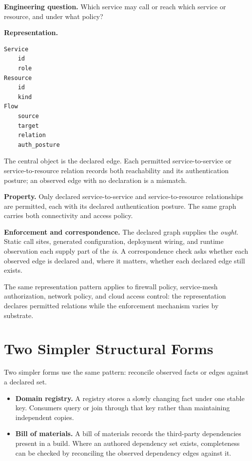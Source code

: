 \textbf{Engineering question.} Which service may call or reach which service or resource, and under what policy?

\textbf{Representation.}

\begin{verbatim}
Service
    id
    role
Resource
    id
    kind
Flow
    source
    target
    relation
    auth_posture
\end{verbatim}

The central object is the declared edge. Each permitted service-to-service or service-to-resource relation records both reachability and its authentication posture; an observed edge with no declaration is a mismatch.

\textbf{Property.} Only declared service-to-service and service-to-resource relationships are permitted, each with its declared authentication posture. The same graph carries both connectivity and access policy.

\textbf{Enforcement and correspondence.} The declared graph supplies the \emph{ought}. Static call sites, generated configuration, deployment wiring, and runtime observation each supply part of the \emph{is}. A correspondence check asks whether each observed edge is declared and, where it matters, whether each declared edge still exists.

The same representation pattern applies to firewall policy, service-mesh authorization, network policy, and cloud access control: the representation declares permitted relations while the enforcement mechanism varies by substrate.

\section{Two Simpler Structural Forms}\label{heading:two-simpler-structural-forms}

Two simpler forms use the same pattern: reconcile observed facts or edges against a declared set.

\begin{itemize}
\tightlist
\item
  \textbf{Domain registry.} A registry stores a slowly changing fact under one stable key. Consumers query or join through that key rather than maintaining independent copies.
\item
  \textbf{Bill of materials.} A bill of materials records the third-party dependencies present in a build. Where an authored dependency set exists, completeness can be checked by reconciling the observed dependency edges against it.
\end{itemize}
